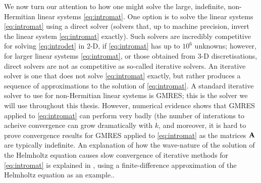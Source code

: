 We now turn our attention to how one might solve the large, indefinite, non-Hermitian linear systems \eqref{eq:intromat}. One option is to solve the linear systems \eqref{eq:intromat} using a direct solver (solvers that, up to machine precision, invert the linear system \eqref{eq:intromat} exactly). Such solvers are incredibly competitive for solving \eqref{eq:introdet} in 2-D, if \eqref{eq:intromat} has up to $10^6$ unknowns; however, for larger linear systems \eqref{eq:intromat}, or those obtained from 3-D discretisations, direct solvers are not as competitive as so-called iterative solvers. An iterative solver is one that does not solve \eqref{eq:intromat} exactly, but rather produces a sequence of approximations to the solution of \eqref{eq:intromat}. A standard iterative solver to use for non-Hermitian linear systems is GMRES; this is the solver we will use throughout this thesis. However, numerical evidence shows that GMRES applied to \eqref{eq:intromat} can perform very badly (the number of interations to acheive convergence can grow dramatically with $k$, and moreover, it is hard to prove convergence results for GMRES applied to \eqref{eq:intromat} as the matrices $\mathbf{A}$ are typically indefinite. An explanation of how the wave-nature of the solution of the Helmholtz equation causes slow convergence of iterative methods for \eqref{eq:intromat} is explained in \cite[Section 2.1]{ErGa:12}, using a finite-difference approximation of the Helmholtz equation as an example..

